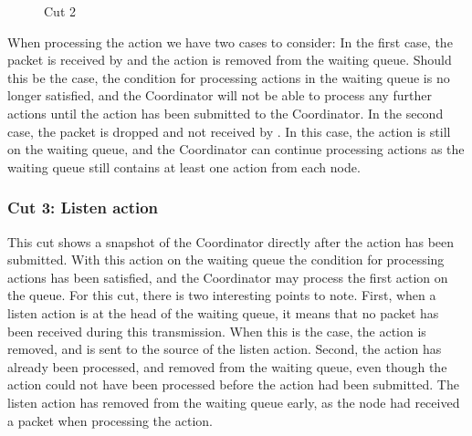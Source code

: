 
\begin{figure}[H]
    \centering

    \caption{Cut 2}\label{tikz:coordinatormsc2}
\end{figure}

When processing the  action we have two cases to consider: In the first case, the packet is received by  and the  action is removed from the waiting queue. Should this be the case, the condition for processing actions in the waiting queue is no longer satisfied, and the Coordinator will not be able to process any further actions until the  action has been submitted to the Coordinator. In the second case, the packet is dropped and not received by . In this case, the  action is still on the waiting queue, and the Coordinator can continue processing actions as the waiting queue still contains at least one action from each node.

\subsubsection{Cut 3: Listen action}
This cut shows a snapshot of the Coordinator directly after the  action has been submitted. With this action on the waiting queue the condition for processing actions has been satisfied, and the Coordinator may process the first action on the queue. For this cut, there is two interesting points to note. First, when a listen action is at the head of the waiting queue, it means that no packet has been received during this transmission. When this is the case, the action is removed, and \KwNull is sent to the source of the listen action. Second, the  action has already been processed, and removed from the waiting queue, even though the action could not have been processed before the  action had been submitted. The listen action has removed from the waiting queue early, as the node had received a packet when processing the  action.  \smallbreak

